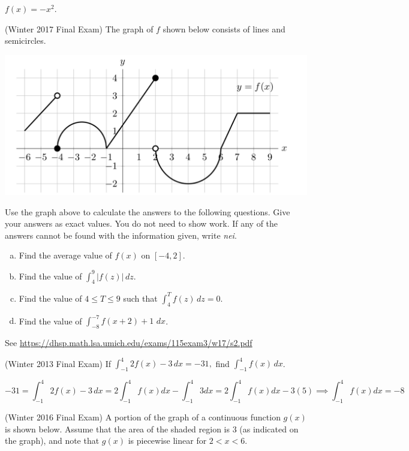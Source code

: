 \documentclass[11pt]{exam}
\begin{document}
\begin{questions}
\begin{solution}
  \(f(x) = -x^2\). 
\end{solution}
\question (Winter 2017 Final Exam) %
The graph of $f$ shown below consists of lines and semicircles.	
\begin{center}
  \includegraphics[scale=0.5]{graph1}
\end{center}
Use the graph above to calculate the answers to the following questions. Give your answers as exact values. You do not need to show work. If any of the answers cannot be found with the information given, write \emph{nei}.
\begin{enumerate}[(a)]
	\item Find the average value of $f(x)$ on $[-4,2]$.
	\item Find the value of $\displaystyle\int_{4}^9 |f(z)| \, dz$.
	\item Find the value of $4 \leqslant T \leqslant 9$ such that $\displaystyle\int_{4}^T f(z) \, dz = 0$.
	\item Find the value of $\displaystyle\int_{-8}^{-7} f(x+2)+1 \,\, dx$.
\end{enumerate}
\begin{solution}
  See \href{https://dhsp.math.lsa.umich.edu/exams/115exam3/w17/s2.pdf}{https://dhsp.math.lsa.umich.edu/exams/115exam3/w17/s2.pdf}
\end{solution}
\question (Winter 2013 Final Exam) %
	If $\displaystyle\int_{-1}^4 2 f(x) - 3 \, dx = -31,$ find $\displaystyle\int_{-1}^4 f(x)  \, dx$.
        \begin{solution}
          \[
            -31 = \int_{-1}^4 2 f(x) - 3 \, dx = 2\int_{-1}^4 f(x) dx -
            \int_{-1}^4 3 dx = 2 \int_{-1}^4 f(x) dx - 3(5) \implies
            \int_{-1}^4 f(x) dx = -8
          \]
        \end{solution}
\pagebreak
\question (Winter 2016 Final Exam)
A portion of the graph of a continuous function $g(x)$ is shown below. Assume that the area of the shaded region is 3 (as indicated on the graph), and note that $g(x)$ is piecewise linear for $2 < x < 6$.

\end{questions}
\end{document}
